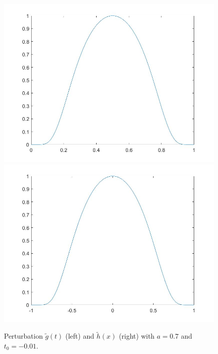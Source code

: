 \documentclass[11pt, a4paper]{article}
\theoremstyle{definition}
\begin{document}
\begin{figure}[h]
	\includegraphics[scale=0.3]{Perttime1.jpg}
	\includegraphics[scale=0.3]{Perttimespace1.jpg}
	\caption{Perturbation $\tilde g(t)$ (left) and $\tilde h(x)$ (right) with $a =0.7$ and $t_0 = -0.01$.}
	\label{Perttime1}
\end{figure}
\end{document}
